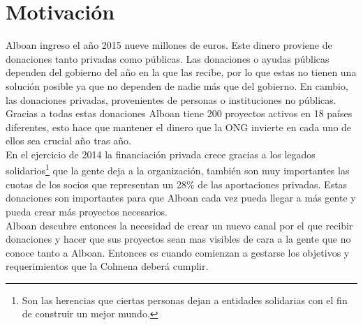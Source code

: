 \section{Motivación}
Alboan ingreso el año 2015 nueve millones de euros. Este dinero proviene de donaciones tanto privadas como públicas. Las donaciones o ayudas públicas dependen del gobierno del año en la que las recibe, por lo que estas no tienen una solución posible ya que no dependen de nadie más que del gobierno. En cambio, las donaciones privadas, provenientes de personas o instituciones no públicas. Gracias a todas estas donaciones Alboan tiene 200 proyectos activos en 18 países diferentes, esto hace que mantener el dinero que la ONG invierte en cada uno de ellos sea crucial año tras año. \\

En el ejercicio de 2014 la financiación privada crece gracias a los legados solidarios\footnote{Son las herencias que ciertas personas dejan a entidades solidarias con el fin de construir un mejor mundo.} que la gente deja a la organización, también son muy importantes las cuotas de los socios que representan un 28\% de las aportaciones privadas. Estas donaciones son importantes para que Alboan cada vez pueda llegar a más gente y pueda crear más proyectos necesarios.\\

Alboan descubre entonces la necesidad de crear un nuevo canal por el que recibir donaciones y hacer que sus proyectos sean mas visibles de cara a la gente que no conoce tanto a Alboan. Entonces es cuando comienzan a gestarse los objetivos y requerimientos que la Colmena deberá cumplir.\\


